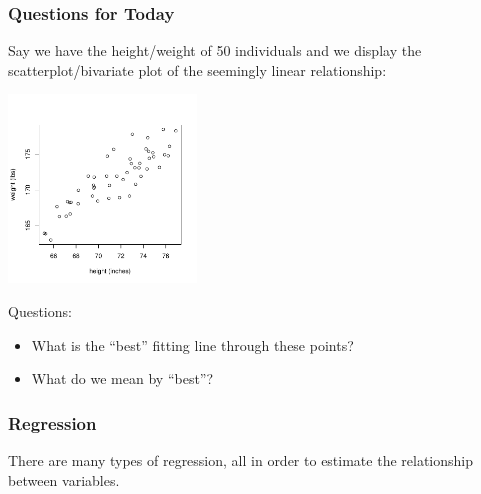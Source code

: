 \documentclass[handout]{beamer}
\newcommand{\blue}[1]{\textcolor{blue2}{#1}}
\begin{document}
\begin{frame}[fragile]
\frametitle{Questions for Today}

Say we have the height/weight of 50 individuals and we display the scatterplot/bivariate plot of the seemingly \blue{linear} relationship:
\begin{center}
\includegraphics[height=5cm]{figure/lec24-002.pdf}
\end{center}
\pause Questions:  
\begin{itemize}
\item What is the ``best'' fitting line through these points?
\item What do we mean by ``best''?
\end{itemize}

\end{frame}


\begin{frame}[fragile]
\frametitle{Regression}
There are many types of \blue{regression}, all in order to estimate the relationship between variables.  
%
%

\end{frame}
\end{document}
